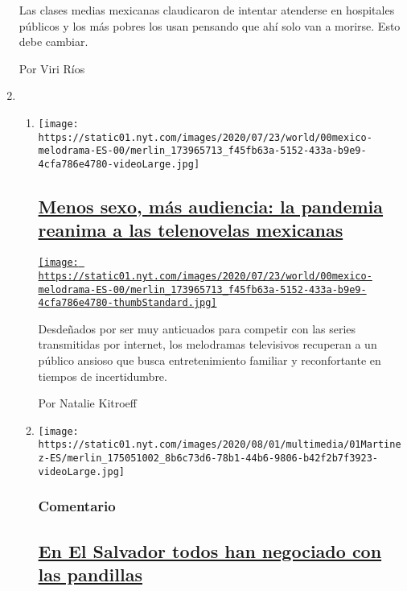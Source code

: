 \begin{enumerate}
  Las clases medias mexicanas claudicaron de intentar atenderse en
  hospitales públicos y los más pobres los usan pensando que ahí solo
  van a morirse. Esto debe cambiar.

  Por Viri Ríos
\item
  \begin{enumerate}
  \def\labelenumii{\arabic{enumii}.}
  \item
    \texttt{[image: https://static01.nyt.com/images/2020/07/23/world/00mexico-melodrama-ES-00/merlin\_173965713\_f45fb63a-5152-433a-b9e9-4cfa786e4780-videoLarge.jpg]}

    \hypertarget{menos-sexo-muxe1s-audiencia-la-pandemia-reanima-a-las-telenovelas-mexicanas}{%
    \subsection{\texorpdfstring{\href{/es/2020/08/02/espanol/america-latina/televisa-rosa-de-guadalupe-netflix.html}{Menos
    sexo, más audiencia: la pandemia reanima a las telenovelas
    mexicanas}}{Menos sexo, más audiencia: la pandemia reanima a las telenovelas mexicanas}}\label{menos-sexo-muxe1s-audiencia-la-pandemia-reanima-a-las-telenovelas-mexicanas}}

    \href{/es/2020/08/02/espanol/america-latina/televisa-rosa-de-guadalupe-netflix.html}{\texttt{[image: https://static01.nyt.com/images/2020/07/23/world/00mexico-melodrama-ES-00/merlin\_173965713\_f45fb63a-5152-433a-b9e9-4cfa786e4780-thumbStandard.jpg]}}

    Desdeñados por ser muy anticuados para competir con las series
    transmitidas por internet, los melodramas televisivos recuperan a un
    público ansioso que busca entretenimiento familiar y reconfortante
    en tiempos de incertidumbre.

    Por Natalie Kitroeff
  \item
    \texttt{[image: https://static01.nyt.com/images/2020/08/01/multimedia/01Martinez-ES/merlin\_175051002\_8b6c73d6-78b1-44b6-9806-b42f2b7f3923-videoLarge.jpg]}

    \hypertarget{comentario-1}{%
    \subsubsection{Comentario}\label{comentario-1}}

    \hypertarget{en-el-salvador-todos-han-negociado-con-las-pandillas}{%
    \subsection{\texorpdfstring{\href{/es/2020/08/02/espanol/opinion/pandillas-el-salvador.html}{En
    El Salvador todos han negociado con las
    pandillas}}{En El Salvador todos han negociado con las pandillas}}\label{en-el-salvador-todos-han-negociado-con-las-pandillas}}


\end{enumerate}
\end{enumerate}
